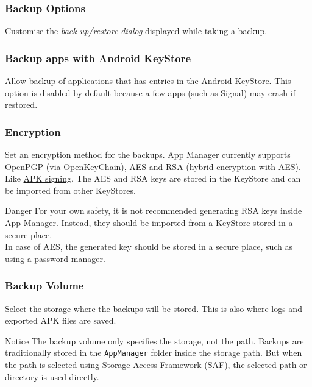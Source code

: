 \subsubsection{Backup Options}\label{subsubsec:settings-backup-options} %
Customise the \textit{back up/restore dialog} displayed while taking a backup.


\subsubsection{Backup apps with Android KeyStore} %
Allow backup of applications that has entries in the Android KeyStore. This option is disabled by default because a few apps (such as Signal) may crash if restored.

\subsubsection{Encryption}\label{subsubsec:settings-encryption} %
Set an encryption method for the backups. App Manager currently supports OpenPGP (via
\href{https://f-droid.org/packages/org.sufficientlysecure.keychain/}{OpenKeyChain}), AES and RSA (hybrid encryption with AES).
Like \hyperref[subsec:apk-signing]{APK signing}, The AES and RSA keys are stored in the KeyStore and can be imported from other KeyStores.

\begin{danger}{Danger}
    For your own safety, it is not recommended generating RSA keys inside App Manager. Instead, they should be imported from a KeyStore stored in a secure place.\\
    In case of AES, the generated key should be stored in a secure place, such as using a password manager.
\end{danger}

\subsubsection{Backup Volume}\label{subsubsec:backup-volume} %
Select the storage where the backups will be stored. This is also where logs and exported APK files are saved.

\begin{tip}{Notice}
    The backup volume only specifies the storage, not the path. Backups are traditionally stored in the \texttt{AppManager} folder inside the storage path.
    But when the path is selected using Storage Access Framework (SAF), the selected path or directory is used directly.
\end{tip}

